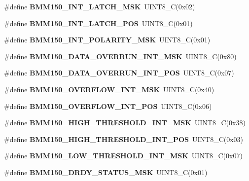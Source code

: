 \begin{DoxyCompactItemize}
\#define {\bfseries B\+M\+M150\+\_\+\+I\+N\+T\+\_\+\+L\+A\+T\+C\+H\+\_\+\+M\+SK}~U\+I\+N\+T8\+\_\+C(0x02)
\item 
\mbox{\label{group___b_m_m150_gacfc902bb655b1d2e2e4256a5085e6064}} 
\#define {\bfseries B\+M\+M150\+\_\+\+I\+N\+T\+\_\+\+L\+A\+T\+C\+H\+\_\+\+P\+OS}~U\+I\+N\+T8\+\_\+C(0x01)
\item 
\mbox{\label{group___b_m_m150_ga2643a7722210bda41ea1b611b3ab107c}} 
\#define {\bfseries B\+M\+M150\+\_\+\+I\+N\+T\+\_\+\+P\+O\+L\+A\+R\+I\+T\+Y\+\_\+\+M\+SK}~U\+I\+N\+T8\+\_\+C(0x01)
\item 
\mbox{\label{group___b_m_m150_ga8ac2909be129e0632c0244eb7b9deaa2}} 
\#define {\bfseries B\+M\+M150\+\_\+\+D\+A\+T\+A\+\_\+\+O\+V\+E\+R\+R\+U\+N\+\_\+\+I\+N\+T\+\_\+\+M\+SK}~U\+I\+N\+T8\+\_\+C(0x80)
\item 
\mbox{\label{group___b_m_m150_ga9823c43fea416cf8009de77da5572295}} 
\#define {\bfseries B\+M\+M150\+\_\+\+D\+A\+T\+A\+\_\+\+O\+V\+E\+R\+R\+U\+N\+\_\+\+I\+N\+T\+\_\+\+P\+OS}~U\+I\+N\+T8\+\_\+C(0x07)
\item 
\mbox{\label{group___b_m_m150_gac79f5b0b52b9eee50e374245c4524161}} 
\#define {\bfseries B\+M\+M150\+\_\+\+O\+V\+E\+R\+F\+L\+O\+W\+\_\+\+I\+N\+T\+\_\+\+M\+SK}~U\+I\+N\+T8\+\_\+C(0x40)
\item 
\mbox{\label{group___b_m_m150_gaa4edc012c386f7c193bf3e40a325a14b}} 
\#define {\bfseries B\+M\+M150\+\_\+\+O\+V\+E\+R\+F\+L\+O\+W\+\_\+\+I\+N\+T\+\_\+\+P\+OS}~U\+I\+N\+T8\+\_\+C(0x06)
\item 
\mbox{\label{group___b_m_m150_ga575e4da1c0354a8230f9af750bfb262f}} 
\#define {\bfseries B\+M\+M150\+\_\+\+H\+I\+G\+H\+\_\+\+T\+H\+R\+E\+S\+H\+O\+L\+D\+\_\+\+I\+N\+T\+\_\+\+M\+SK}~U\+I\+N\+T8\+\_\+C(0x38)
\item 
\mbox{\label{group___b_m_m150_ga1cca3f6e5ae12231a6fe398dd1ac64e8}} 
\#define {\bfseries B\+M\+M150\+\_\+\+H\+I\+G\+H\+\_\+\+T\+H\+R\+E\+S\+H\+O\+L\+D\+\_\+\+I\+N\+T\+\_\+\+P\+OS}~U\+I\+N\+T8\+\_\+C(0x03)
\item 
\mbox{\label{group___b_m_m150_ga1b8658f2d5484f74cb604ef530e0967a}} 
\#define {\bfseries B\+M\+M150\+\_\+\+L\+O\+W\+\_\+\+T\+H\+R\+E\+S\+H\+O\+L\+D\+\_\+\+I\+N\+T\+\_\+\+M\+SK}~U\+I\+N\+T8\+\_\+C(0x07)
\item 
\mbox{\label{group___b_m_m150_ga43243b4162867b9812cbc9e8ac59f881}} 
\#define {\bfseries B\+M\+M150\+\_\+\+D\+R\+D\+Y\+\_\+\+S\+T\+A\+T\+U\+S\+\_\+\+M\+SK}~U\+I\+N\+T8\+\_\+C(0x01)
\end{DoxyCompactItemize}
